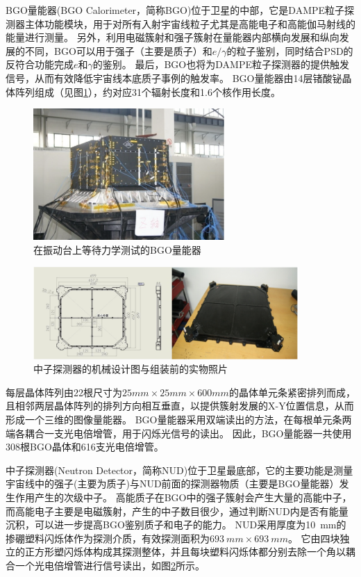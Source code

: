 BGO量能器(BGO Calorimeter，简称BGO)位于卫星的中部\parencite{bgo_zhangzhiyong_thesis}，它是DAMPE粒子探测器主体功能模块，用于对所有入射宇宙线粒子尤其是高能电子和高能伽马射线的能量进行测量。
另外，利用电磁簇射和强子簇射在量能器内部横向发展和纵向发展的不同，BGO可以用于强子（主要是质子）和$e/\gamma$的粒子鉴别，同时结合PSD的反符合功能完成$e$和$\gamma$的鉴别。
最后，BGO也将为DAMPE粒子探测器的提供触发信号，从而有效降低宇宙线本底质子事例的触发率。
BGO量能器由14层锗酸铋晶体阵列组成（见图\ref{fig:introduction:bgo}），约对应31个辐射长度和1.6个核作用长度。
\begin{figure}[htbp]
	\centering
	\includegraphics[width=0.65\textwidth]{chap/introduction/fig/bgo.png}
	\caption{在振动台上等待力学测试的BGO量能器}
	\label{fig:introduction:bgo}
\end{figure}

\begin{figure}[!htbp]
	\centering
	\includegraphics[width=0.9\textwidth]{chap/introduction/fig/nud.png}
	\caption{中子探测器的机械设计图与组装前的实物照片}
	\label{fig:introduction:nud}
\end{figure}
每层晶体阵列由22根尺寸为$25mm\times 25mm \times 600mm$的晶体单元条紧密排列而成，且相邻两层晶体阵列的排列方向相互垂直，以提供簇射发展的X-Y位置信息，从而形成一个三维的图像量能器。
BGO量能器采用双端读出的方法，在每根单元条两端各耦合一支光电倍增管，用于闪烁光信号的读出。
因此，BGO量能器一共使用308根BGO晶体和616支光电倍增管。


中子探测器(Neutron Detector，简称NUD)位于卫星最底部\parencite{changjin_introduction_2014}，它的主要功能是测量宇宙线中的强子(主要为质子)与NUD前面的探测器物质（主要是BGO量能器）发生作用产生的次级中子。
高能质子在BGO中的强子簇射会产生大量的高能中子，而高能电子主要是电磁簇射，产生的中子数目很少，通过判断NUD内是否有能量沉积，可以进一步提高BGO鉴别质子和电子的能力\parencite{changjin_nud_2015}。
NUD采用厚度为\SI{10}{mm}的掺硼塑料闪烁体作为探测介质，有效探测面积为$\SI{693}{mm}\times\SI{693}{mm}$。
它由四块独立的正方形塑闪烁体构成其探测整体，并且每块塑料闪烁体都分别去除一个角以耦合一个光电倍增管进行信号读出，如图\ref{fig:introduction:nud}所示。
